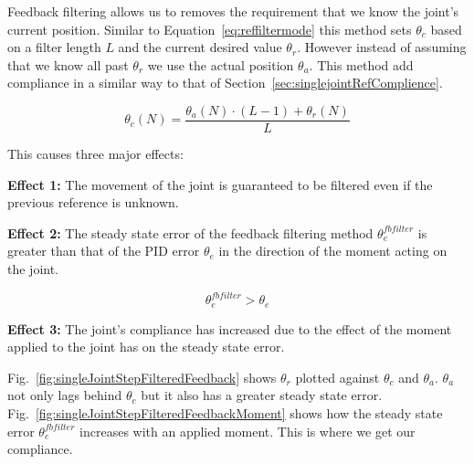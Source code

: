 Feedback filtering allows us to removes the requirement that we know the joint's current position.
Similar to Equation~\ref{eq:reffiltermode} this method sets $\theta_c$ based on a filter length $L$ and the current desired value $\theta_r$.
However instead of assuming that we know all past $\theta_r$ we use the actual position $\theta_a$.
This method add compliance in a similar way to that of Section~\ref{sec:singlejointRefComplience}.


\begin{equation}\label{eq:refencmode}
\theta_c(N) = \frac{\theta_a(N)\cdot\left(L-1\right) + \theta_r(N)}{L}
\end{equation}

This causes three major effects: 

\noindent \textbf{Effect 1:} The movement of the joint is guaranteed to be filtered even if the previous reference is unknown.

\noindent \textbf{Effect 2:} The steady state error of the feedback filtering method $\theta_e^{fbfilter}$ is greater than that of the PID error $\theta_e$ in the direction of the moment acting on the joint.

\begin{equation}
\theta_e^{fbfilter} > \theta_e
\end{equation}

\noindent \textbf{Effect 3:} The joint's compliance has increased due to the effect of the moment applied to the joint has on the steady state error.



Fig.~\ref{fig:singleJointStepFilteredFeedback} shows $\theta_r$ plotted against $\theta_c$ and $\theta_a$.  
$\theta_a$ not only lags behind $\theta_c$ but it also has a greater steady state error.
Fig.~\ref{fig:singleJointStepFilteredFeedbackMoment} shows how the steady state error $\theta_e^{fbfilter}$ increases with an applied moment.
This is where we get our compliance.

